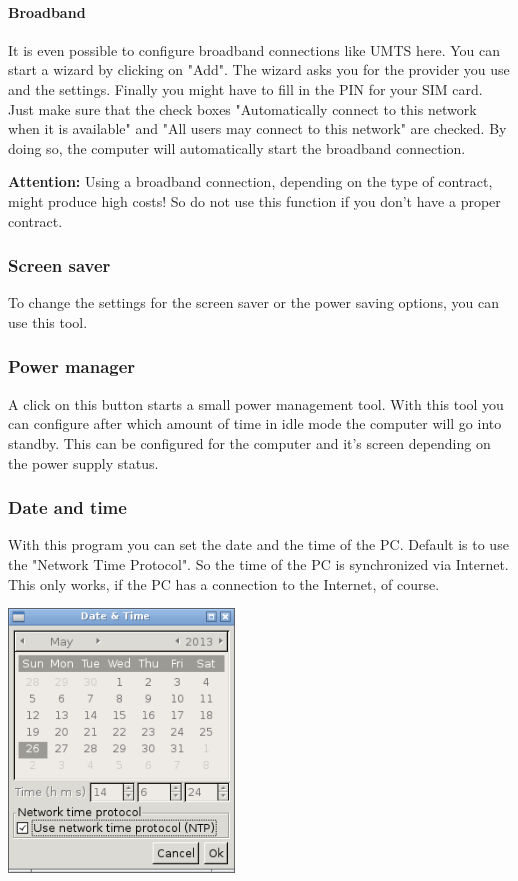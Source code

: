\documentclass[a4paper,12pt,twoside]{article}
\begin{document}
\paragraph{Broadband}
\label{sct:broadband}
It is even possible to configure broadband connections like UMTS here.
You can start a wizard by clicking on
"Add". The wizard asks you for the provider
you use and the settings. Finally you might have to fill in the PIN for
your SIM card. Just make sure that the check boxes "Automatically connect 
to this network when it is available" and "All users may connect to this 
network" are checked. By doing so, the computer will automatically start 
the broadband connection.

\bigskip
\textbf{Attention:} Using a broadband connection, depending on the type of
contract, might produce high costs! So do not use this function if you
don't have a proper contract.
\bigskip

\subsubsection{Screen saver}
\label{sct:screen_saver}
To change the settings for the screen saver or the power saving options,
you can use this tool.


\subsubsection{Power manager}
\label{sct:power_management}
A click on this button starts a small power management tool. With this tool
you can configure after which amount of time in idle mode the computer will 
go into standby. This can be configured for the computer and it's screen 
depending on the power supply status.


\subsubsection{Date and time}
\label{sct:date_time}
With this program you can set the date and the time of the PC. Default
is to use the "Network Time Protocol". So
the time of the PC is synchronized via Internet. This only works, if
the PC has a connection to the Internet, of course.

\bigskip
\begin{minipage}{\linewidth}
  \centering
  \captionsetup{type=figure}
  \includegraphics[width=6cm]{screenshots/efaLiveen-img26.png}
  \label{fig:date_time}
\end{minipage}
\bigskip
\end{document}
